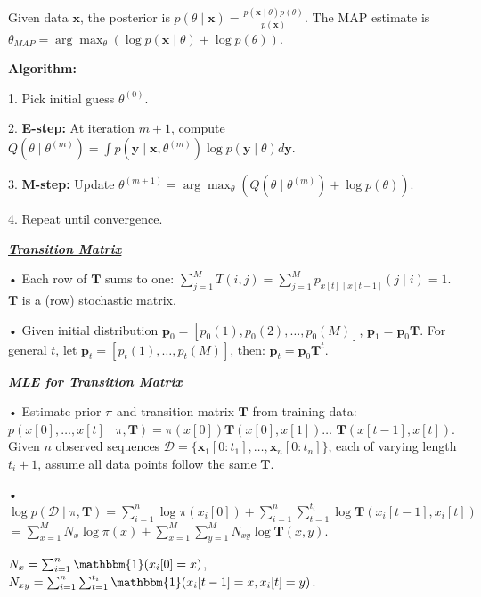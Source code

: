 \documentclass[10pt]{article}
\newcommand{\bulletPoint}[1]{\ul{\textit{\textbf{#1}}}}
\begin{document}
\begin{multicols*}{3}
Given data $\mathbf{x}$, the posterior is $p(\theta \mid \mathbf{x}) = \frac{p(\mathbf{x} \mid \theta) p(\theta)}{p(\mathbf{x})}$. The MAP estimate is $\theta_{MAP} = \arg\max_{\theta} \left( \log p(\mathbf{x} \mid \theta) + \log p(\theta) \right)$. 

\textbf{Algorithm:}

1. Pick initial guess $\theta^{(0)}$.

2. \textbf{E-step:} At iteration $m+1$, compute $Q(\theta \mid \theta^{(m)}) = \int p(\mathbf{y} \mid \mathbf{x}, \theta^{(m)}) \log p(\mathbf{y} \mid \theta) d\mathbf{y}$.

3. \textbf{M-step:} Update $\theta^{(m+1)} = \arg\max_{\theta} \left( Q(\theta \mid \theta^{(m)}) + \log p(\theta) \right)$.

4. Repeat until convergence. 

    


\bulletPoint{Transition Matrix}\quad

• Each row of $\mathbf{T}$ sums to one: $\sum_{j=1}^{M} T(i, j) = \sum_{j=1}^{M} p_{x[t] \mid x[t-1]}(j \mid i) = 1$.
$\mathbf{T}$ is a (row) stochastic matrix.

• Given initial distribution $\mathbf{p}_0 = [p_0(1), p_0(2), \dots, p_0(M)]$,  $\mathbf{p}_1 = \mathbf{p}_0 \mathbf{T}$. For general $t$, let $\mathbf{p}_t = [p_t(1), \dots, p_t(M)]$, then: $\mathbf{p}_t = \mathbf{p}_0 \mathbf{T}^t$.


\bulletPoint{MLE for Transition Matrix}\quad

• Estimate prior $\pi$ and transition matrix $\mathbf{T}$ from training data:
$p(x[0], \dots, x[t] \mid \pi, \mathbf{T}) = \pi(x[0]) \mathbf{T}(x[0], x[1])  \dots$ $\mathbf{T}(x[t-1], x[t])$.
Given $n$ observed sequences $\mathcal{D} = \{\mathbf{x}_1[0:t_1], \dots, \mathbf{x}_n[0:t_n]\}$, each of varying length $t_i+1$, assume all data points follow the same $\mathbf{T}$. 

• $\log p(\mathcal{D} \mid \pi, \mathbf{T}) = \sum_{i=1}^{n} \log \pi(x_i[0]) + \sum_{i=1}^{n} \sum_{t=1}^{t_i} \log \mathbf{T}(x_i[t-1], x_i[t])$
$= \sum_{x=1}^{M} N_x \log \pi(x) + \sum_{x=1}^{M} \sum_{y=1}^{M} N_{xy} \log \mathbf{T}(x, y)$. 

$N_x = \sum_{i=1}^{n} \mathbbm{1}(x_i[0] = x)$, $N_{xy} = \sum_{i=1}^{n} \sum_{t=1}^{t_i} \mathbbm{1}(x_i[t-1] = x, x_i[t] = y)$. 


\end{multicols*}
\end{document}
